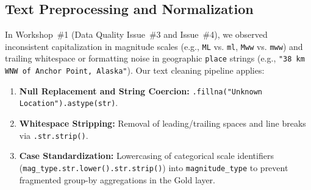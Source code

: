 \subsection{Text Preprocessing and Normalization}
In Workshop~\#1 (Data Quality Issue~\#3 and Issue~\#4), we observed inconsistent capitalization in magnitude scales (e.g., \texttt{ML} vs. \texttt{ml}, \texttt{Mww} vs. \texttt{mww}) and trailing whitespace or formatting noise in geographic \texttt{place} strings (e.g., \texttt{"38 km WNW of Anchor Point, Alaska"}). Our text cleaning pipeline applies:
\begin{enumerate}
    \item \textbf{Null Replacement and String Coercion:} \texttt{.fillna("Unknown Location").astype(str)}.
    \item \textbf{Whitespace Stripping:} Removal of leading/trailing spaces and line breaks via \texttt{.str.strip()}.
    \item \textbf{Case Standardization:} Lowercasing of categorical scale identifiers (\texttt{mag\_type.str.lower().str.strip()}) into \texttt{magnitude\_type} to prevent fragmented group-by aggregations in the Gold layer.
\end{enumerate}

